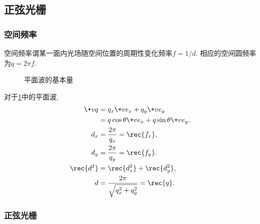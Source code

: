 \documentclass{ctexart}
\begin{document}


\subsection{正弦光栅} %
\label{sub:正弦光栅}

\subsubsection{空间频率} %
\label{ssub:空间频率}

空间频率谓某一面内光场随空间位置的周期性变化频率$f=1/d$. 相应的空间圆频率为$q=2\pi f$.
\begin{figure}[ht]
    \centering
    \caption{平面波的基本量}
    \label{fig:平面波的基本量}
\end{figure}
\begin{sample}
    \begin{ex}
        对于\cref{fig:平面波的基本量}中的平面波,
        \begin{align*}
            \+vq &= q_x \+ve_x + q_y \+ve_y \\
            &= q\cos\theta \+ve_x + q\sin\theta \+ve_y. \\
            d_x &= \frac{2\pi}{q_x} = \rec{f_x}, \\
            d_y &= \frac{2\pi}{q_y} = \rec{f_y}. \\
            \rec{d^2} &= \rec{d_x^2} + \rec{d_y^2}, \\
            d &= \frac{2\pi}{\sqrt{q_x^2 + q_y^2}} = \rec{q}.
        \end{align*}
    \end{ex}
\end{sample}


\subsubsection{正弦光栅} %
\label{ssub:正弦光栅}
\end{document}
